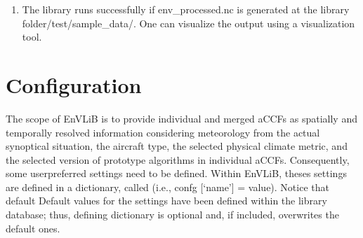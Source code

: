 \documentclass[a4paper,11pt,english]{sphinxmanual}
\begin{document}
\begin{sphinxVerbatim}[commandchars=\\\{\}]
  
\end{sphinxVerbatim}
\begin{enumerate}
%
\setcounter{enumi}{3}
\item {} 
\sphinxAtStartPar
The library runs successfully if env\_processed.nc is generated at the library folder/test/sample\_data/. One can visualize the output using a visualization tool.

\end{enumerate}


\section{Configuration}
\label{\detokenize{gStarted:configuration}}
\sphinxAtStartPar
The scope of EnVLiB is to provide individual and merged aCCFs as spatially and temporally resolved information considering meteorology from the actual synoptical situation, the aircraft type, the selected physical climate metric, and the selected version of prototype algorithms in individual aCCFs. Consequently, some user\sphinxhyphen{}preferred settings need to
be defined. Within EnVLiB, theses settings are defined in a dictionary, called  (i.e., confg {[}‘name’{]} = value). Notice that default
Default values for the settings have been defined within the library database; thus, defining dictionary  is optional and, if included, overwrites the default ones.
\end{document}
